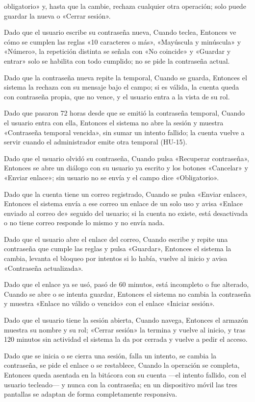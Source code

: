 {      obligatorio» y, hasta que la cambie, rechaza cualquier otra operación; solo puede
      guardar la nueva o «Cerrar sesión».
\item Dado que el usuario escribe su contraseña nueva, Cuando teclea, Entonces ve cómo se
      cumplen las reglas «10 caracteres o más», «Mayúscula y minúscula» y «Número», la
      repetición distinta se señala con «No coincide» y «Guardar y entrar» solo se
      habilita con todo cumplido; no se pide la contraseña actual.
\item Dado que la contraseña nueva repite la temporal, Cuando se guarda, Entonces el
      sistema la rechaza con su mensaje bajo el campo; si es válida, la cuenta queda con
      contraseña propia, que no vence, y el usuario entra a la vista de su rol.
\item Dado que pasaron 72 horas desde que se emitió la contraseña temporal, Cuando el
      usuario entra con ella, Entonces el sistema no abre la sesión y muestra «Contraseña
      temporal vencida», sin sumar un intento fallido; la cuenta vuelve a servir cuando
      el administrador emite otra temporal (HU-15).
\item Dado que el usuario olvidó su contraseña, Cuando pulsa «Recuperar contraseña»,
      Entonces se abre un diálogo con su usuario ya escrito y los botones «Cancelar» y
      «Enviar enlace»; sin usuario no se envía y el campo dice «Obligatorio».
\item Dado que la cuenta tiene un correo registrado, Cuando se pulsa «Enviar enlace»,
      Entonces el sistema envía a ese correo un enlace de un solo uso y avisa «Enlace
      enviado al correo de» seguido del usuario; si la cuenta no existe, está desactivada
      o no tiene correo responde lo mismo y no envía nada.
\item Dado que el usuario abre el enlace del correo, Cuando escribe y repite una
      contraseña que cumple las reglas y pulsa «Guardar», Entonces el sistema la cambia,
      levanta el bloqueo por intentos si lo había, vuelve al inicio y avisa «Contraseña
      actualizada».
\item Dado que el enlace ya se usó, pasó de 60 minutos, está incompleto o fue alterado,
      Cuando se abre o se intenta guardar, Entonces el sistema no cambia la contraseña y
      muestra «Enlace no válido o vencido» con el enlace «Iniciar sesión».
\item Dado que el usuario tiene la sesión abierta, Cuando navega, Entonces el armazón
      muestra su nombre y su rol; «Cerrar sesión» la termina y vuelve al inicio, y tras
      120 minutos sin actividad el sistema la da por cerrada y vuelve a pedir el acceso.
\item Dado que se inicia o se cierra una sesión, falla un intento, se cambia la
      contraseña, se pide el enlace o se restablece, Cuando la operación se completa,
      Entonces queda asentada en la bitácora con su cuenta ---el intento fallido, con el
      usuario tecleado--- y nunca con la contraseña; en un dispositivo móvil las tres
      pantallas se adaptan de forma completamente responsiva.}

